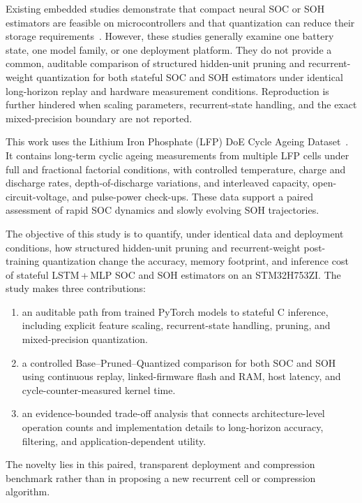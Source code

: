 \documentclass[review]{elsarticle}
\begin{document}
Existing embedded studies demonstrate that compact neural SOC or SOH estimators are feasible on microcontrollers and that quantization can reduce their storage requirements~\cite{crocioniLiIonBatteriesParameter2020,giazitzisCaseStudyTiny2024,Embedded_AI_only_SOC_mobile,Embedded_AI_SOH_badData,naguibMicroprocessorExecutionTime2022}. However, these studies generally examine one battery state, one model family, or one deployment platform. They do not provide a common, auditable comparison of structured hidden-unit pruning and recurrent-weight quantization for both stateful SOC and SOH estimators under identical long-horizon replay and hardware measurement conditions. Reproduction is further hindered when scaling parameters, recurrent-state handling, and the exact mixed-precision boundary are not reported.

This work uses the Lithium Iron Phosphate (LFP) DoE Cycle Ageing Dataset~\cite{LFP_DoE_Cycle_Aging_Dataset}. It contains long-term cyclic ageing measurements from multiple LFP cells under full and fractional factorial conditions, with controlled temperature, charge and discharge rates, depth-of-discharge variations, and interleaved capacity, open-circuit-voltage, and pulse-power check-ups. These data support a paired assessment of rapid SOC dynamics and slowly evolving SOH trajectories.

The objective of this study is to quantify, under identical data and deployment conditions, how structured hidden-unit pruning and recurrent-weight post-training quantization change the accuracy, memory footprint, and inference cost of stateful LSTM\,+\,MLP SOC and SOH estimators on an STM32H753ZI. The study makes three contributions:
\begin{enumerate}[label=(\roman*),leftmargin=*,nosep]
    \item an auditable path from trained PyTorch models to stateful C inference, including explicit feature scaling, recurrent-state handling, pruning, and mixed-precision quantization.
    \item a controlled Base--Pruned--Quantized comparison for both SOC and SOH using continuous replay, linked-firmware flash and RAM, host latency, and cycle-counter-measured kernel time.
    \item an evidence-bounded trade-off analysis that connects architecture-level operation counts and implementation details to long-horizon accuracy, filtering, and application-dependent utility.
\end{enumerate}
The novelty lies in this paired, transparent deployment and compression benchmark rather than in proposing a new recurrent cell or compression algorithm.
\end{document}
